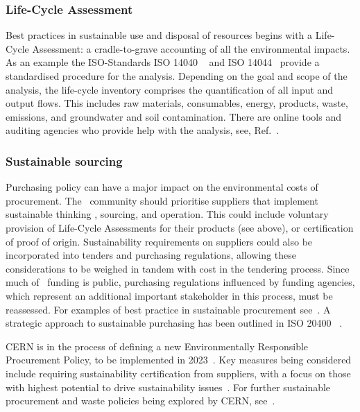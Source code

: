 \documentclass[../SustainableHEP.tex]{subfiles}
\begin{document}
\subsubsection{Life-Cycle Assessment}

Best practices in sustainable use and disposal of resources begins with a Life-Cycle Assessment: a cradle-to-grave accounting of all the environmental impacts.  As an example the ISO-Standards ISO 14040 ~\cite{ISO14040} and ISO 14044~\cite{ISO14044} provide a standardised procedure for the analysis. Depending on the goal and scope of the analysis, the life-cycle inventory comprises the quantification of all input and output flows. This includes raw materials, consumables, energy, products, waste, emissions, and groundwater and soil contamination. There are online tools and auditing agencies who provide help with the analysis, see, \eg Ref.~\cite{ProBasSi}.

\subsubsection{Sustainable sourcing \label{sec:sustainablesourcing}}

Purchasing policy can have a major impact on the environmental costs of procurement. 
The \ACR\ community should prioritise suppliers that implement sustainable thinking , sourcing,  and operation. This could include voluntary provision of Life-Cycle Assessments for their products (see above), or certification of \eg proof of origin.
Sustainability requirements on suppliers could also be incorporated into tenders and purchasing regulations, allowing these considerations to be weighed in tandem with cost in the tendering process.  Since much of \ACR\ funding is public, purchasing regulations influenced by funding agencies, which represent an additional important stakeholder in this process, must be reassessed.  For examples of best practice in sustainable procurement see~.  A strategic approach to sustainable purchasing has been outlined in ISO 20400 ~\cite{ISO20400}.  

CERN is in the process of defining a new Environmentally Responsible Procurement Policy, to be implemented in 2023~\cite{Hartley}.  Key measures being considered include requiring sustainability certification from suppliers, with a focus on those with highest potential to drive sustainability issues~\cite{Hartley}.  For further sustainable procurement and waste policies being explored by CERN, see~.  
\end{document}
